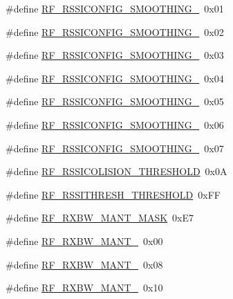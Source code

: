 \begin{DoxyCompactItemize}
\item 
\#define \mbox{\hyperlink{sx1276_regs-_fsk_8h_af10e6a0d1b88f5750047c1a87c5cdd7c}{R\+F\+\_\+\+R\+S\+S\+I\+C\+O\+N\+F\+I\+G\+\_\+\+S\+M\+O\+O\+T\+H\+I\+N\+G\+\_}}~0x01
\item 
\#define \mbox{\hyperlink{sx1276_regs-_fsk_8h_a3edb9e3f6851690fc218c719ca858763}{R\+F\+\_\+\+R\+S\+S\+I\+C\+O\+N\+F\+I\+G\+\_\+\+S\+M\+O\+O\+T\+H\+I\+N\+G\+\_}}~0x02
\item 
\#define \mbox{\hyperlink{sx1276_regs-_fsk_8h_a796004e51661fdbde6d228017452dbfe}{R\+F\+\_\+\+R\+S\+S\+I\+C\+O\+N\+F\+I\+G\+\_\+\+S\+M\+O\+O\+T\+H\+I\+N\+G\+\_}}~0x03
\item 
\#define \mbox{\hyperlink{sx1276_regs-_fsk_8h_af3544ebacc23f2f0da15339288abd88b}{R\+F\+\_\+\+R\+S\+S\+I\+C\+O\+N\+F\+I\+G\+\_\+\+S\+M\+O\+O\+T\+H\+I\+N\+G\+\_}}~0x04
\item 
\#define \mbox{\hyperlink{sx1276_regs-_fsk_8h_aae348ea0ba017e4bc7ce0ad98205a9a6}{R\+F\+\_\+\+R\+S\+S\+I\+C\+O\+N\+F\+I\+G\+\_\+\+S\+M\+O\+O\+T\+H\+I\+N\+G\+\_}}~0x05
\item 
\#define \mbox{\hyperlink{sx1276_regs-_fsk_8h_a65690fc4263834d89464b781dfbf0abe}{R\+F\+\_\+\+R\+S\+S\+I\+C\+O\+N\+F\+I\+G\+\_\+\+S\+M\+O\+O\+T\+H\+I\+N\+G\+\_}}~0x06
\item 
\#define \mbox{\hyperlink{sx1276_regs-_fsk_8h_ab1e32dfa6c5a4e8707b17a39d4c952f2}{R\+F\+\_\+\+R\+S\+S\+I\+C\+O\+N\+F\+I\+G\+\_\+\+S\+M\+O\+O\+T\+H\+I\+N\+G\+\_}}~0x07
\item 
\#define \mbox{\hyperlink{sx1276_regs-_fsk_8h_ad81b4cc0e3351a069dc394f00a68b24b}{R\+F\+\_\+\+R\+S\+S\+I\+C\+O\+L\+I\+S\+I\+O\+N\+\_\+\+T\+H\+R\+E\+S\+H\+O\+LD}}~0x0A
\item 
\#define \mbox{\hyperlink{sx1276_regs-_fsk_8h_ae89a3fe6abf9275ab02fa1ab30aefb8d}{R\+F\+\_\+\+R\+S\+S\+I\+T\+H\+R\+E\+S\+H\+\_\+\+T\+H\+R\+E\+S\+H\+O\+LD}}~0x\+FF
\item 
\#define \mbox{\hyperlink{sx1276_regs-_fsk_8h_acd14c73e628d64f102dbe34390ab20d5}{R\+F\+\_\+\+R\+X\+B\+W\+\_\+\+M\+A\+N\+T\+\_\+\+M\+A\+SK}}~0x\+E7
\item 
\#define \mbox{\hyperlink{sx1276_regs-_fsk_8h_a0e07506869ee3d7bb6e989c67a94f1bc}{R\+F\+\_\+\+R\+X\+B\+W\+\_\+\+M\+A\+N\+T\+\_}}~0x00
\item 
\#define \mbox{\hyperlink{sx1276_regs-_fsk_8h_a3c69e1b355ce895eb1390fc921a27d51}{R\+F\+\_\+\+R\+X\+B\+W\+\_\+\+M\+A\+N\+T\+\_}}~0x08
\item 
\#define \mbox{\hyperlink{sx1276_regs-_fsk_8h_a372ceb3b14593993f8b7f2a25220675b}{R\+F\+\_\+\+R\+X\+B\+W\+\_\+\+M\+A\+N\+T\+\_}}~0x10

\end{DoxyCompactItemize}

